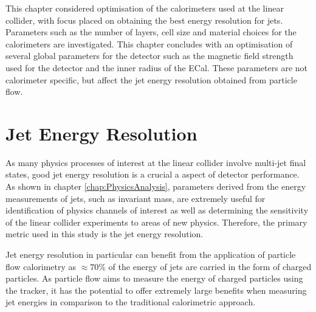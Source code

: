 This chapter considered optimisation of the calorimeters used at the linear collider, with focus placed on obtaining the best energy resolution for jets.  Parameters such as the number of layers, cell size and material choices for the calorimeters are investigated.  This chapter concludes with an optimisation of several global parameters for the detector such as the magnetic field strength used for the detector and the inner radius of the ECal.  These parameters are not calorimeter specific, but affect the jet energy resolution obtained from particle flow. 


\section{Jet Energy Resolution}
\label{sec:optstudiesmetric}
As many physics processes of interest at the linear collider involve multi-jet final states, good jet energy resolution is a crucial a aspect of detector performance.  As shown in chapter \ref{chap:PhysicsAnalysis}, parameters derived from the energy measurements of jets, such as invariant mass, are extremely useful for identification of physics channels of interest as well as determining the sensitivity of the linear collider experiments to areas of new physics.  Therefore, the primary metric used in this study is the jet energy resolution.

Jet energy resolution in particular can benefit from the application of particle flow calorimetry as $\approx 70 \%$ of the energy of jets are carried in the form of charged particles.  As particle flow aims to measure the energy of charged particles using the tracker, it has the potential to offer extremely large benefits when measuring jet energies in comparison to the traditional calorimetric approach.  


